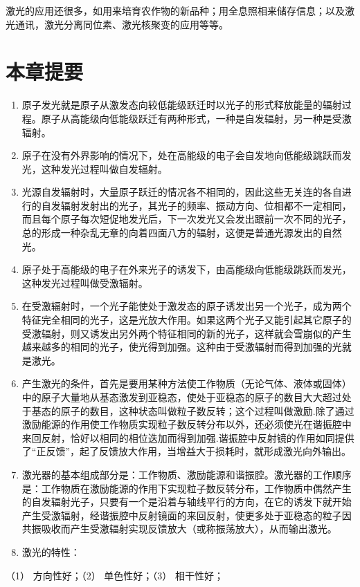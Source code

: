 激光的应用还很多，如用来培育农作物的新品种；用全息照相来储存信息；以及激光通讯，激光分离同位素、激光核聚变的应用等等。

\section{本章提要}

\begin{enumerate}
\item
  原子发光就是原子从激发态向较低能级跃迁时以光子的形式释放能量的辐射过程。原子从高能级向低能级跃迁有两种形式，一种是自发辐射，另一种是受激辐射。
\item
  原子在没有外界影响的情况下，处在高能级的电子会自发地向低能级跳跃而发光，这种发光过程叫做自发辐射。
\item
  光源自发辐射时，大量原子跃迁的情况各不相同的，因此这些无关连的各自进行的自发辐射发射出的光子，其光子的频率、振动方向、位相都不一定相同，而且每个原子每次短促地发光后，下一次发光又会发出跟前一次不同的光子，总的形成一种杂乱无章的向着四面八方的辐射，这便是普通光源发出的自然光。
\item
  原子处于高能级的电子在外来光子的诱发下，由高能级向低能级跳跃而发光，这种发光过程叫做受激辐射。
\item
  在受激辐射时，一个光子能使处于激发态的原子诱发出另一个光子，成为两个特征完全相同的光子，这是光放大作用。如果这两个光子又能引起其它原子的受激辐射，则又诱发出另外两个特征相同的新的光子，这样就会雪崩似的产生越来越多的相同的光子，使光得到加强。这种由于受激辐射而得到加强的光就是激光。
\item
  产生激光的条件，首先是要用某种方法使工作物质（无论气体、液体或固体）中的原子大量地从基态激发到亚稳态，使处于亚稳态的原子的数目大大超过处于基态的原子的数目，这种状态叫做粒子数反转；这个过程叫做激励.除了通过激励能源的作用使工作物质实现粒子数反转分布以外，还必须使光在谐振腔中来回反射，恰好以相同的相位迭加而得到加强.谐振腔中反射镜的作用如同提供了``正反馈''，起了反馈放大作用，当增益大于损耗时，就形成激光向外输出。
\item
  激光器的基本组成部分是：工作物质、激励能源和谐振腔。激光器的工作顺序是：工作物质在激励能源的作用下实现粒子数反转分布，工作物质中偶然产生的自发辐射光子，只要有一个是沿着与轴线平行的方向，在它的诱发下就开始产生受激辐射，经谐振腔中反射镜面的来回反射，使更多处于亚稳态的粒子因共振吸收而产生受激辐射实现反馈放大（或称振荡放大），从而输出激光。
\item
  激光的特性：
\end{enumerate}

（1） 方向性好；（2） 单色性好；（3） 相干性好；


